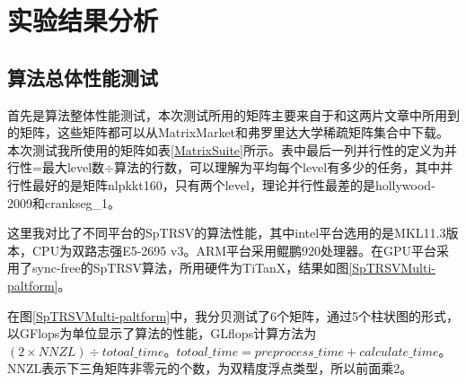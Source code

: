 \chapter{实验结果分析}
\section{算法总体性能测试}

首先是算法整体性能测试，本次测试所用的矩阵主要来自于\cite{park2014sparsifying}和\cite{liuSyncFree2016}这两片文章中所用到的矩阵，这些矩阵都可以从MatrixMarket和弗罗里达大学稀疏矩阵集合中下载。本次测试我所使用的矩阵如表\ref{MatrixSuite}所示。表中最后一列并行性的定义为并行性=最大level数$ \div $算法的行数，可以理解为平均每个level有多少的任务，其中并行性最好的是矩阵nlpkkt160，只有两个level，理论并行性最差的是hollywood-2009和crankseg\_1。


\begin{table}[htbp]
    \caption{性能测试所用矩阵}
    \label{MatrixSuite}
\end{table}

这里我对比了不同平台的SpTRSV的算法性能，其中intel平台选用的是MKL11.3版本，CPU为双路志强E5-2695 v3。ARM平台采用鲲鹏920处理器。在GPU平台采用了sync-free的SpTRSV算法，所用硬件为TiTanX，结果如图\ref{SpTRSVMulti-paltform}。

在图\ref{SpTRSVMulti-paltform}中，我分贝测试了6个矩阵，通过5个柱状图的形式，以GFlops为单位显示了算法的性能，GLflops计算方法为$(2 \times NNZL)  \div totoal\_time$。$totoal\_time = preprocess\_time + calculate\_time$。
NNZL表示下三角矩阵非零元的个数，为双精度浮点类型，所以前面乘2。



